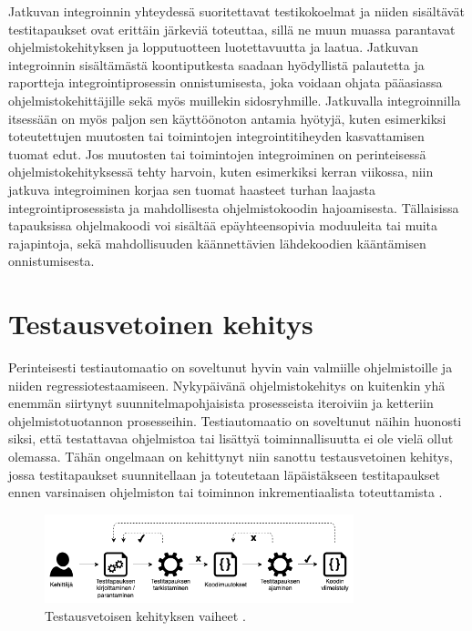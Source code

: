   Jatkuvan integroinnin yhteydessä suoritettavat testikokoelmat ja niiden sisältävät testitapaukset ovat erittäin järkeviä toteuttaa, sillä ne muun muassa parantavat ohjelmistokehityksen ja lopputuotteen luotettavuutta ja laatua.
  Jatkuvan integroinnin sisältämästä koontiputkesta saadaan hyödyllistä palautetta ja raportteja integrointiprosessin onnistumisesta, joka voidaan ohjata pääasiassa ohjelmistokehittäjille sekä myös muillekin sidosryhmille.
  Jatkuvalla integroinnilla itsessään on myös paljon sen käyttöönoton antamia hyötyjä, kuten esimerkiksi toteutettujen muutosten tai toimintojen integrointitiheyden kasvattamisen tuomat edut.
  Jos muutosten tai toimintojen integroiminen on perinteisessä ohjelmistokehityksessä tehty harvoin, kuten esimerkiksi kerran viikossa, niin jatkuva integroiminen korjaa sen tuomat haasteet turhan laajasta integrointiprosessista ja mahdollisesta ohjelmistokoodin hajoamisesta.
  Tällaisissa tapauksissa ohjelmakoodi voi sisältää epäyhteensopivia moduuleita tai muita rajapintoja, sekä mahdollisuuden käännettävien lähdekoodien kääntämisen onnistumisesta.

\section{Testausvetoinen kehitys} \label{ch:07_testausvetoinen_kehitys}

  Perinteisesti testiautomaatio on soveltunut hyvin vain valmiille ohjelmistoille ja niiden regressiotestaamiseen.
  Nykypäivänä ohjelmistokehitys on kuitenkin yhä enemmän siirtynyt suunnitelmapohjaisista prosesseista iteroiviin ja ketteriin ohjelmistotuotannon prosesseihin.
  Testiautomaatio on soveltunut näihin huonosti siksi, että testattavaa ohjelmistoa tai lisättyä toiminnallisuutta ei ole vielä ollut olemassa.
  Tähän ongelmaan on kehittynyt niin sanottu testausvetoinen kehitys, jossa testitapaukset suunnitellaan ja toteutetaan läpäistäkseen testitapaukset ennen varsinaisen ohjelmiston tai toiminnon inkrementiaalista toteuttamista \cite{istqb_glossary_v3_3}.

  \begin{figure}[H]
    \centering
    \includegraphics[width=0.8\textwidth]{assets/testausvetoinen-kehitys.png}
    \caption{Testausvetoisen kehityksen vaiheet \cite[s.~2]{tdd_paper}.}
    \label{fig:testausvetoinen-kehitys}
  \end{figure}

